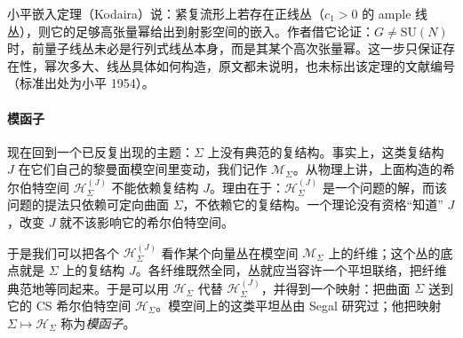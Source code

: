 \begin{yizhu}[含糊点]
小平嵌入定理（Kodaira）说：紧复流形上若存在正线丛（$c_1>0$ 的 ample 线丛），则它的足够高张量幂给出到射影空间的嵌入。作者借它论证：$G\neq\mathrm{SU}(N)$ 时，前量子线丛未必是行列式线丛本身，而是其某个高次张量幂。这一步只保证存在性，幂次多大、线丛具体如何构造，原文都未说明，也未标出该定理的文献编号（标准出处为小平 1954）。
\end{yizhu}

\paragraph{模函子}
现在回到一个已反复出现的主题：$\Sigma$ 上没有典范的复结构。事实上，这类复结构 $J$ 在它们自己的黎曼面模空间里变动，我们记作 $\mathcal{M}_\Sigma$。从物理上讲，上面构造的希尔伯特空间 $\mathcal{H}_\Sigma^{(J)}$ 不能依赖复结构 $J$。理由在于：$\mathcal{H}_\Sigma^{(J)}$ 是一个问题的解，而该问题的提法只依赖可定向曲面 $\Sigma$，不依赖它的复结构。一个理论没有资格“知道” $J$，改变 $J$ 就不该影响它的希尔伯特空间。

于是我们可以把各个 $\mathcal{H}_\Sigma^{(J)}$ 看作某个向量丛在模空间 $\mathcal{M}_\Sigma$ 上的纤维；这个丛的底点就是 $\Sigma$ 上的复结构 $J$。各纤维既然全同，丛就应当容许一个平坦联络，把纤维典范地等同起来。于是可以用 $\mathcal{H}_\Sigma$ 代替 $\mathcal{H}_\Sigma^{(J)}$，并得到一个映射：把曲面 $\Sigma$ 送到它的 CS 希尔伯特空间 $\mathcal{H}_\Sigma$。模空间上的这类平坦丛由 Segal \cite{segal} 研究过；他把映射 $\Sigma\mapsto\mathcal{H}_\Sigma$ 称为\textit{模函子}。

